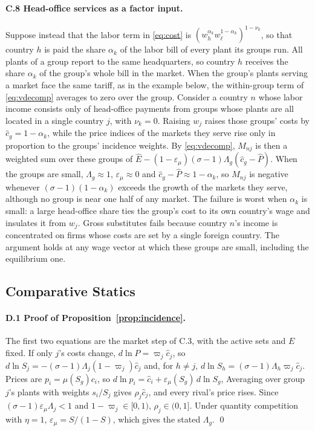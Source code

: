 \documentclass[11pt]{article}
\theoremstyle{definition}
\theoremstyle{remark}
\begin{document}
\paragraph{C.8 Head-office services as a factor input.}
\label{app:hqinput}
Suppose instead that the labor term in \eqref{eq:cost} is
$(w_h^{\alpha_k}w_\ell^{1-\alpha_k})^{1-\nu_k}$, so that country $h$ is paid the share
$\alpha_k$ of the labor bill of every plant its groups run. All plants of a group
report to the same headquarters, so country $h$ receives the share $\alpha_k$ of the
group's whole bill in the market. When the group's plants serving a market face the
same tariff, as in the example below, the within-group term of \eqref{eq:vdecomp}
averages to zero over the group. Consider a country $n$ whose labor income consists
only of head-office payments from groups whose plants are all located in a single
country $j$, with $\nu_k=0$. Raising $w_j$ raises those groups' costs by $\hat
c_g=1-\alpha_k$, while the price indices of the markets they serve rise only in
proportion to the groups' incidence weights. By \eqref{eq:vdecomp}, $M_{nj}$ is then a
weighted sum over these groups of $\hat E-(1-\varepsilon_\mu)(\sigma-1)\Lambda_g(\hat
c_g-\hat P)$. When the groups are small, $\Lambda_g\approx1$, $\varepsilon_\mu\approx0$
and $\hat c_g-\hat P\approx1-\alpha_k$, so $M_{nj}$ is negative whenever
$(\sigma-1)(1-\alpha_k)$ exceeds the growth of the markets they serve, although no
group is near one half of any market. The failure is worst when $\alpha_k$ is
small: a large head-office share ties the group's cost to its own country's wage and
insulates it from $w_j$. Gross substitutes fails because country $n$'s income is
concentrated on firms whose costs are set by a single foreign country. The argument
holds at any wage vector at which these groups are small, including the equilibrium
one.

\subsection{Comparative Statics}
\label{app:cs}

\paragraph{D.1 Proof of Proposition~\ref{prop:incidence}.} The first two equations are
the market step of C.3, with the active sets and $E$ fixed. If only $j$'s costs change,
$d\ln P=\varpi_j\hat c_j$, so $d\ln S_j=-(\sigma-1)\Lambda_j(1-\varpi_j)\hat c_j$ and,
for $h\neq j$, $d\ln S_h=(\sigma-1)\Lambda_h\varpi_j\hat c_j$. Prices are
$p_i=\mu(S_g)c_i$, so $d\ln p_i=\hat c_i+\varepsilon_\mu(S_g)\,d\ln S_g$, Averaging over
group $j$'s plants with weights $s_i/S_j$ gives $\rho_j\hat c_j$, and every rival's
price rises. Since
$(\sigma-1)\varepsilon_\mu\Lambda_j<1$ and $1-\varpi_j\in[0,1)$, $\rho_j\in(0,1]$.
Under quantity competition with $\eta=1$, $\varepsilon_\mu=S/(1-S)$, which gives the
stated $\Lambda_g$. \qed
\end{document}
